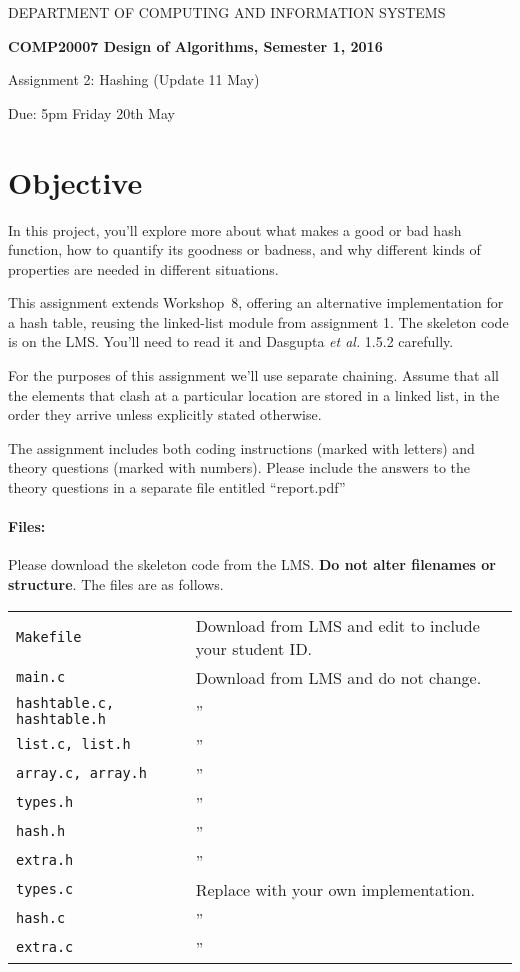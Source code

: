 \documentclass[11pt]{article}
\title{}
\date{}
\begin{document}
{\large
\begin{center}
DEPARTMENT OF COMPUTING AND INFORMATION SYSTEMS\vspace{2ex}

{\Large\bf
COMP20007 Design of Algorithms, Semester 1, 2016

Assignment 2: Hashing (Update 11 May)

}\vspace{2ex}

Due: 5pm Friday 20th May
\end{center}
}

\section*{Objective}
In this project, you'll explore more about what makes a good or bad hash function,
how to quantify its goodness or badness,
and why different kinds of properties are needed in different situations.

This assignment extends Workshop~8,
offering an alternative implementation for a hash table,
reusing the linked-list module from assignment 1.
The skeleton code is on the LMS\@.
You'll need to read it and Dasgupta {\it et al.} \/1.5.2 carefully.

For the purposes of this assignment we'll use separate chaining.
Assume that all the elements that clash at a particular location are stored in a linked list,
in the order they arrive unless explicitly stated otherwise.

The assignment includes both coding instructions
(marked with letters)
and theory questions (marked with numbers).
Please include the answers to the theory questions in a separate file entitled ``report.pdf''

\paragraph{Files:}
Please download the skeleton code from the LMS\@.
{\bf Do not alter filenames or structure}.
The files are as follows.

\begin{center}
\begin{tabular}{ll}
\toprule
\texttt{Makefile} & Download from LMS and edit to include your student ID.\\
\texttt{main.c} & Download from LMS and do not change.\\
\texttt{hashtable.c, hashtable.h} & '' \\
\texttt{list.c, list.h} & '' \\
\texttt{array.c, array.h} & '' \\
\texttt{types.h} & '' \\
\texttt{hash.h} & '' \\
\texttt{extra.h} & '' \\
\midrule
\texttt{types.c} & Replace with your own implementation.\\
\texttt{hash.c} & '' \\
\texttt{extra.c} & '' \\
\bottomrule
\end{tabular}
\end{center}
\end{document}
